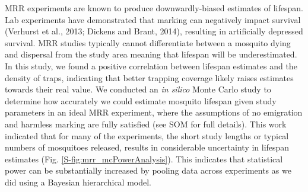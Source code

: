 \documentclass[]{article}
\begin{document}
MRR experiments are known to produce downwardly-biased estimates of
lifespan. Lab experiments have demonstrated that marking can negatively
impact survival (Verhurst et al., 2013; Dickens and Brant, 2014),
resulting in artificially depressed survival. MRR studies typically
cannot differentiate between a mosquito dying and dispersal from the
study area meaning that lifespan will be underestimated. In this study,
we found a positive correlation between lifespan estimates and the
density of traps, indicating that better trapping coverage likely raises
estimates towards their real value. We conducted an \emph{in silico}
Monte Carlo study to determine how accurately we could estimate mosquito
lifespan given study parameters in an ideal MRR experiment, where the
assumptions of no emigration and harmless marking are fully satisfied
(see SOM for full details). This work indicated that for many of the
experiments, the short study lengths or typical numbers of mosquitoes
released, results in considerable uncertainty in lifespan estimates (Fig.
\ref{S-fig:mrr_mcPowerAnalysis}). This indicates that statistical power can be substantially
increased by pooling data across experiments as we did using a Bayesian
hierarchical model.
\end{document}

